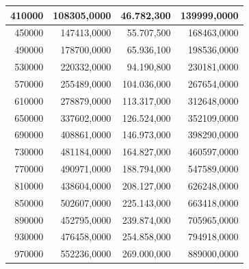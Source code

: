 \documentclass[a4paper, 12pt]{article}
\begin{document}
\begin{longtable}[c]{rrrr}
	\multicolumn{1}{|r|}{410000}                  & \multicolumn{1}{r|}{108305,0000}       & \multicolumn{1}{r|}{46.782,300}        & \multicolumn{1}{r|}{139999,0000}    \\ \hline
	\multicolumn{1}{|r|}{450000}                  & \multicolumn{1}{r|}{147413,0000}       & \multicolumn{1}{r|}{55.707,500}        & \multicolumn{1}{r|}{168463,0000}    \\ \hline
	\multicolumn{1}{|r|}{490000}                  & \multicolumn{1}{r|}{178700,0000}       & \multicolumn{1}{r|}{65.936,100}        & \multicolumn{1}{r|}{198536,0000}    \\ \hline
	\multicolumn{1}{|r|}{530000}                  & \multicolumn{1}{r|}{220332,0000}       & \multicolumn{1}{r|}{94.190,800}        & \multicolumn{1}{r|}{230181,0000}    \\ \hline
	\multicolumn{1}{|r|}{570000}                  & \multicolumn{1}{r|}{255489,0000}       & \multicolumn{1}{r|}{104.036,000}       & \multicolumn{1}{r|}{267654,0000}    \\ \hline
	\multicolumn{1}{|r|}{610000}                  & \multicolumn{1}{r|}{278879,0000}       & \multicolumn{1}{r|}{113.317,000}       & \multicolumn{1}{r|}{312648,0000}    \\ \hline
	\multicolumn{1}{|r|}{650000}                  & \multicolumn{1}{r|}{337602,0000}       & \multicolumn{1}{r|}{126.524,000}       & \multicolumn{1}{r|}{352109,0000}    \\ \hline
	\multicolumn{1}{|r|}{690000}                  & \multicolumn{1}{r|}{408861,0000}       & \multicolumn{1}{r|}{146.973,000}       & \multicolumn{1}{r|}{398290,0000}    \\ \hline
	\multicolumn{1}{|r|}{730000}                  & \multicolumn{1}{r|}{481184,0000}       & \multicolumn{1}{r|}{164.827,000}       & \multicolumn{1}{r|}{460597,0000}    \\ \hline
	\multicolumn{1}{|r|}{770000}                  & \multicolumn{1}{r|}{490971,0000}       & \multicolumn{1}{r|}{188.794,000}       & \multicolumn{1}{r|}{547589,0000}    \\ \hline
	\multicolumn{1}{|r|}{810000}                  & \multicolumn{1}{r|}{438604,0000}       & \multicolumn{1}{r|}{208.127,000}       & \multicolumn{1}{r|}{626248,0000}    \\ \hline
	\multicolumn{1}{|r|}{850000}                  & \multicolumn{1}{r|}{502607,0000}       & \multicolumn{1}{r|}{225.143,000}       & \multicolumn{1}{r|}{663418,0000}    \\ \hline
	\multicolumn{1}{|r|}{890000}                  & \multicolumn{1}{r|}{452795,0000}       & \multicolumn{1}{r|}{239.874,000}       & \multicolumn{1}{r|}{705965,0000}    \\ \hline
	\multicolumn{1}{|r|}{930000}                  & \multicolumn{1}{r|}{476458,0000}       & \multicolumn{1}{r|}{254.858,000}       & \multicolumn{1}{r|}{794918,0000}    \\ \hline
	\multicolumn{1}{|r|}{970000}                  & \multicolumn{1}{r|}{552236,0000}       & \multicolumn{1}{r|}{269.000,000}       & \multicolumn{1}{r|}{889000,0000}    \\ \hline
\end{longtable}
\end{document}
